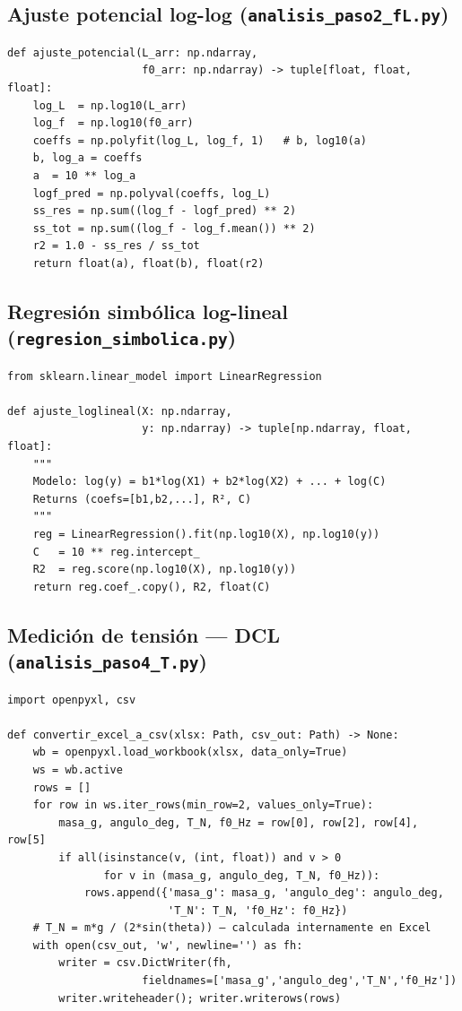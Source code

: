 \documentclass[12pt,a4paper]{article}
\begin{document}
\subsection{Ajuste potencial log-log (\texttt{analisis\_paso2\_fL.py})}

\begin{lstlisting}[caption={Regresión potencial en escala log-log.}]
def ajuste_potencial(L_arr: np.ndarray,
                     f0_arr: np.ndarray) -> tuple[float, float, float]:
    log_L  = np.log10(L_arr)
    log_f  = np.log10(f0_arr)
    coeffs = np.polyfit(log_L, log_f, 1)   # b, log10(a)
    b, log_a = coeffs
    a  = 10 ** log_a
    logf_pred = np.polyval(coeffs, log_L)
    ss_res = np.sum((log_f - logf_pred) ** 2)
    ss_tot = np.sum((log_f - log_f.mean()) ** 2)
    r2 = 1.0 - ss_res / ss_tot
    return float(a), float(b), float(r2)
\end{lstlisting}

\subsection{Regresión simbólica log-lineal (\texttt{regresion\_simbolica.py})}

\begin{lstlisting}[caption={RS para clase de leyes de potencia.}]
from sklearn.linear_model import LinearRegression

def ajuste_loglineal(X: np.ndarray,
                     y: np.ndarray) -> tuple[np.ndarray, float, float]:
    """
    Modelo: log(y) = b1*log(X1) + b2*log(X2) + ... + log(C)
    Returns (coefs=[b1,b2,...], R², C)
    """
    reg = LinearRegression().fit(np.log10(X), np.log10(y))
    C   = 10 ** reg.intercept_
    R2  = reg.score(np.log10(X), np.log10(y))
    return reg.coef_.copy(), R2, float(C)
\end{lstlisting}

\subsection{Medición de tensión — DCL (\texttt{analisis\_paso4\_T.py})}

\begin{lstlisting}[caption={Cálculo de $T$ a partir de la masa y el ángulo.}]
import openpyxl, csv

def convertir_excel_a_csv(xlsx: Path, csv_out: Path) -> None:
    wb = openpyxl.load_workbook(xlsx, data_only=True)
    ws = wb.active
    rows = []
    for row in ws.iter_rows(min_row=2, values_only=True):
        masa_g, angulo_deg, T_N, f0_Hz = row[0], row[2], row[4], row[5]
        if all(isinstance(v, (int, float)) and v > 0
               for v in (masa_g, angulo_deg, T_N, f0_Hz)):
            rows.append({'masa_g': masa_g, 'angulo_deg': angulo_deg,
                         'T_N': T_N, 'f0_Hz': f0_Hz})
    # T_N = m*g / (2*sin(theta)) — calculada internamente en Excel
    with open(csv_out, 'w', newline='') as fh:
        writer = csv.DictWriter(fh,
                     fieldnames=['masa_g','angulo_deg','T_N','f0_Hz'])
        writer.writeheader(); writer.writerows(rows)
\end{lstlisting}
\end{document}
